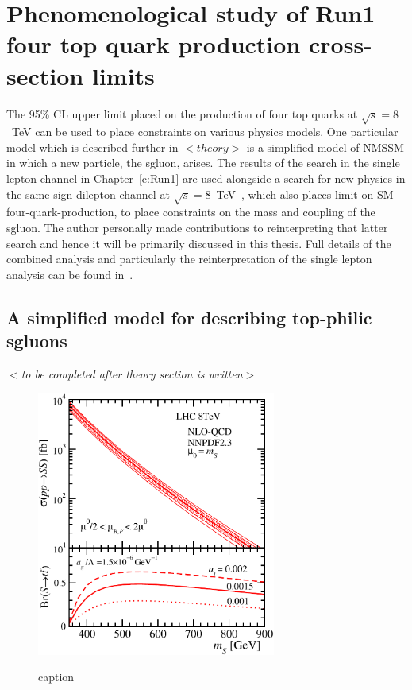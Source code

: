 \chapter{Phenomenological study of Run1 four top quark production cross-section limits}
\label{c:pheno}

The 95\% CL upper limit placed on the production of four top quarks at $\sqrt{s}=8$~TeV can be used to place constraints on various physics models. One particular model which is described further in $<theory>$ is a simplified model of NMSSM in which a new particle, the sgluon, arises. The results of the search in the single lepton channel in Chapter~\ref{c:Run1} are used alongside a search for new physics in the same-sign dilepton channel at $\sqrt{s}=8$~TeV~\cite{Chatrchyan:2013fea}, which also places limit on SM four-quark-production, to place constraints on the mass and coupling of the sgluon. The author personally made contributions to reinterpreting that latter search and hence it will be primarily discussed in this thesis. Full details of the combined analysis and particularly the reinterpretation of the single lepton analysis can be found in~\cite{Beck201548}.

\section{A simplified model for describing top-philic sgluons }
$<$\emph{to be completed after theory section is written}$>$
\begin{figure}[h!]
\centering
    \includegraphics[width=0.7\textwidth]{images/Pheno/xsec.pdf}\\
    \caption{caption}
    \label{fig:sgluonxsec}
\end{figure}
